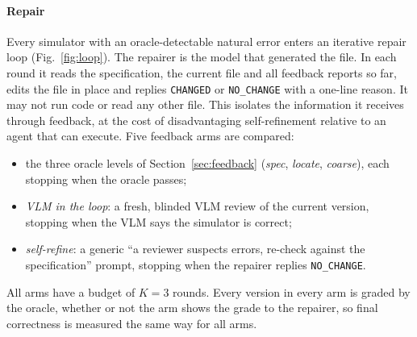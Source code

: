 \paragraph{Repair} Every simulator with an oracle-detectable natural error enters an iterative repair loop (Fig.~\ref{fig:loop}). The repairer is the model that generated the file. In each round it reads the specification, the current file and all feedback reports so far, edits the file in place and replies \texttt{CHANGED} or \texttt{NO\_CHANGE} with a one-line reason. It may not run code or read any other file. This isolates the information it receives through feedback, at the cost of disadvantaging self-refinement relative to an agent that can execute. Five feedback arms are compared:
\begin{itemize}
\item the three oracle levels of Section~\ref{sec:feedback} (\emph{spec}, \emph{locate}, \emph{coarse}), each stopping when the oracle passes;
\item \emph{VLM in the loop}: a fresh, blinded VLM review of the current version, stopping when the VLM says the simulator is correct;
\item \emph{self-refine}: a generic ``a reviewer suspects errors, re-check against the specification'' prompt, stopping when the repairer replies \texttt{NO\_CHANGE}.
\end{itemize}
All arms have a budget of $K=3$ rounds. Every version in every arm is graded by the oracle, whether or not the arm shows the grade to the repairer, so final correctness is measured the same way for all arms.

